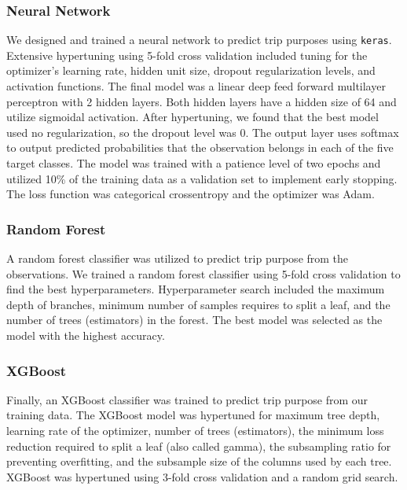 \documentclass[
  article,
  nofooter]{jss}
\begin{document}
\subsubsection{Neural Network}\label{neural-network}

We designed and trained a neural network to predict trip purposes using
\texttt{keras}. Extensive hypertuning using 5-fold cross validation
included tuning for the optimizer's learning rate, hidden unit size,
dropout regularization levels, and activation functions. The final model
was a linear deep feed forward multilayer perceptron with 2 hidden
layers. Both hidden layers have a hidden size of 64 and utilize
sigmoidal activation. After hypertuning, we found that the best model
used no regularization, so the dropout level was 0. The output layer
uses softmax to output predicted probabilities that the observation
belongs in each of the five target classes. The model was trained with a
patience level of two epochs and utilized 10\% of the training data as a
validation set to implement early stopping. The loss function was
categorical crossentropy and the optimizer was Adam.

\subsubsection{Random Forest}\label{random-forest}

A random forest classifier was utilized to predict trip purpose from the
observations. We trained a random forest classifier using 5-fold cross
validation to find the best hyperparameters. Hyperparameter search
included the maximum depth of branches, minimum number of samples
requires to split a leaf, and the number of trees (estimators) in the
forest. The best model was selected as the model with the highest
accuracy.

\subsubsection{XGBoost}\label{xgboost}

Finally, an XGBoost classifier was trained to predict trip purpose from
our training data. The XGBoost model was hypertuned for maximum tree
depth, learning rate of the optimizer, number of trees (estimators), the
minimum loss reduction required to split a leaf (also called gamma), the
subsampling ratio for preventing overfitting, and the subsample size of
the columns used by each tree. XGBoost was hypertuned using 3-fold cross
validation and a random grid search.
\end{document}
